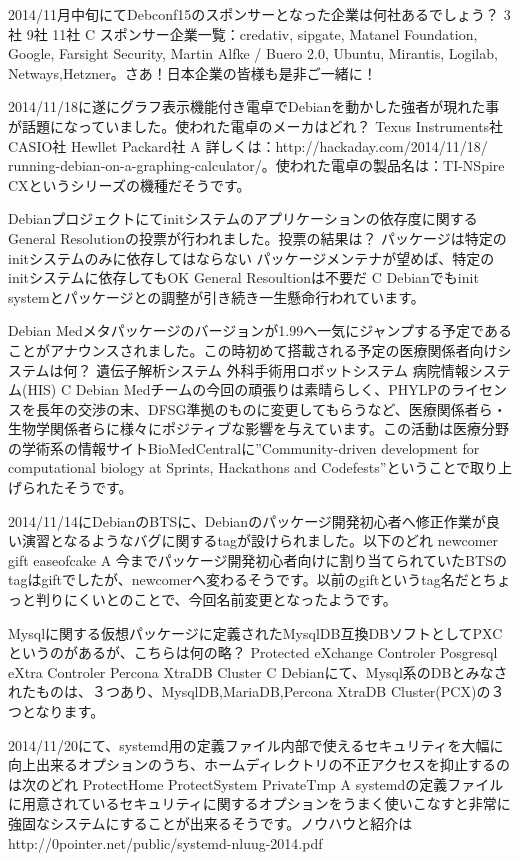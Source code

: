 %

\santaku
{2014/11月中旬にてDebconf15のスポンサーとなった企業は何社あるでしょう？}
{3社}
{9社}
{11社}
{C}
{スポンサー企業一覧：credativ, sipgate, Matanel Foundation, Google,
Farsight Security, Martin Alfke / Buero 2.0, Ubuntu, Mirantis, Logilab,
Netways,Hetzner。さあ！日本企業の皆様も是非ご一緒に！}

\santaku
{2014/11/18に遂にグラフ表示機能付き電卓でDebianを動かした強者が現れた事が話題になっていました。使われた電卓のメーカはどれ？}
{Texus Instruments社}
{CASIO社}
{Hewllet Packard社}
{A}
{詳しくは：http://hackaday.com/2014/11/18/ running-debian-on-a-graphing-calculator/。使われた電卓の製品名は：TI-NSpire CXというシリーズの機種だそうです。}

\santaku
{Debianプロジェクトにてinitシステムのアプリケーションの依存度に関するGeneral Resolutionの投票が行われました。投票の結果は？}
{パッケージは特定のinitシステムのみに依存してはならない}
{パッケージメンテナが望めば、特定のinitシステムに依存してもOK}
{General Resoultionは不要だ}
{C}
{Debianでもinit systemとパッケージとの調整が引き続き一生懸命行われています。}

\santaku
{Debian Medメタパッケージのバージョンが1.99へ一気にジャンプする予定であることがアナウンスされました。この時初めて搭載される予定の医療関係者向けシステムは何？}
{遺伝子解析システム}
{外科手術用ロボットシステム}
{病院情報システム(HIS)}
{C}
{Debian Medチームの今回の頑張りは素晴らしく、PHYLPのライセンスを長年の交渉の末、DFSG準拠のものに変更してもらうなど、医療関係者ら・生物学関係者らに様々にポジティブな影響を与えています。この活動は医療分野の学術系の情報サイトBioMedCentralに''Community-driven development for computational biology at Sprints, Hackathons and Codefests''ということで取り上げられたそうです。}

\santaku
{2014/11/14にDebianのBTSに、Debianのパッケージ開発初心者へ修正作業が良い演習となるようなバグに関するtagが設けられました。以下のどれ}
{newcomer}
{gift}
{easeofcake}
{A}
{今までパッケージ開発初心者向けに割り当てられていたBTSのtagはgiftでしたが、newcomerへ変わるそうです。以前のgiftというtag名だとちょっと判りにくいとのことで、今回名前変更となったようです。}

\santaku
{Mysqlに関する仮想パッケージに定義されたMysqlDB互換DBソフトとしてPXCというのがあるが、こちらは何の略？}
{Protected eXchange Controler}
{Posgresql eXtra Controler}
{Percona XtraDB Cluster}
{C}
{Debianにて、Mysql系のDBとみなされたものは、３つあり、MysqlDB,MariaDB,Percona XtraDB Cluster(PCX)の３つとなります。}

\santaku
{2014/11/20にて、systemd用の定義ファイル内部で使えるセキュリティを大幅に向上出来るオプションのうち、ホームディレクトリの不正アクセスを抑止するのは次のどれ}
{ProtectHome}
{ProtectSystem}
{PrivateTmp}
{A}
{systemdの定義ファイルに用意されているセキュリティに関するオプションをうまく使いこなすと非常に強固なシステムにすることが出来るそうです。ノウハウと紹介はhttp://0pointer.net/public/systemd-nluug-2014.pdf}














